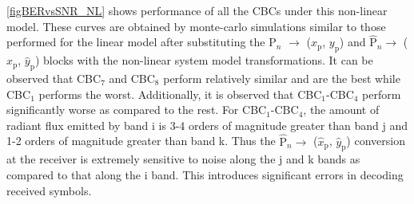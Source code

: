 \figurename{ }\ref{figBERvsSNR_NL} shows performance of all the CBCs under this non-linear model. These curves are obtained by monte-carlo simulations similar to those performed for the linear model after substituting the P$_{n}$ $\rightarrow$ ($x_{\text{p}}$, $y_{\text{p}}$) and $\hat{\text{P}}_{n}\rightarrow$ ($\hat{x}_{\text{p}}$, $\hat{y}_{\text{p}}$) blocks with the non-linear system model transformations. It can be observed that CBC$_{7}$ and CBC$_{8}$ perform relatively similar and are the best while CBC$_{1}$ performs the worst. Additionally, it is observed that CBC$_{1}$-CBC$_{4}$ perform significantly worse as compared to the rest. For CBC$_{1}$-CBC$_{4}$, the amount of radiant flux emitted by band i is 3-4 orders of magnitude greater than band j and 1-2 orders of magnitude greater than band k. Thus the $\hat{\text{P}}_{n}\rightarrow$ ($\hat{x}_{\text{p}}$, $\hat{y}_{\text{p}}$) conversion at the receiver is extremely sensitive to noise along the j and k bands as compared to that along the i band. This introduces significant errors in decoding received symbols.

